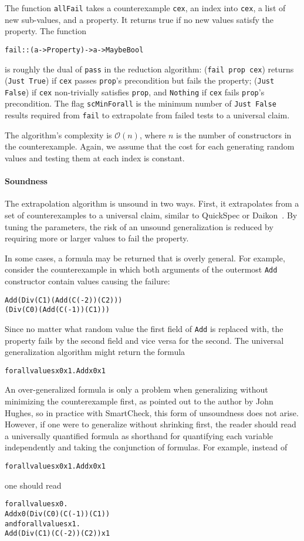\documentclass{sigplanconf}
\newenvironment{code}{\begin{alltt}\footnotesize}{\end{alltt}}
\newcommand{\ttp}[1]{\texttt{#1}}
\begin{document}
The function \ttp{allFail} takes a counterexample \ttp{cex}, an index into
\ttp{cex}, a list of new sub-values, and a property.  It returns true if no new
values satisfy the property.  The function
%
\begin{code}
fail :: (a -> Property) -> a -> Maybe Bool
\end{code}
%
\noindent
is roughly the dual of \ttp{pass} in the reduction algorithm: (\ttp{fail
  prop cex}) returns (\ttp{Just True}) if \ttp{cex} passes \ttp{prop}'s
precondition but fails the property; (\ttp{Just False}) if \ttp{cex}
non-trivially satisfies \ttp{prop}, and \ttp{Nothing} if \ttp{cex} fails
\ttp{prop}'s precondition.  The flag \ttp{scMinForall} is the minimum number
of \ttp{Just False} results required from \ttp{fail} to extrapolate from failed
tests to a universal claim.

The algorithm's complexity is $\mathcal{O}(n)$, where $n$ is the number of
constructors in the counterexample.  Again, we assume that the cost for each
generating random values and testing them at each index is constant.

\paragraph{Soundness}
The extrapolation algorithm is unsound in two ways.  First, it extrapolates from
a set of counterexamples to a universal claim, similar to QuickSpec or
Daikon~\cite{qs,daikon}.  By tuning the parameters, the risk of an unsound
generalization is reduced by requiring more or larger values to fail the
property.

In some cases, a formula may be returned that is overly general.  For example,
consider the counterexample in which both arguments of the outermost \ttp{Add}
constructor contain values causing the failure:
%
\begin{code}
Add (Div (C 1) (Add (C (-2)) (C 2)))
    (Div (C 0) (Add (C (-1)) (C 1)))
\end{code}
%
\noindent
Since no matter what random value the first field of \ttp{Add} is replaced with,
the property fails by the second field and vice versa for the second.  The
universal generalization algorithm might return the formula
\noindent
%
\begin{code}
forall values x0 x1 . Add x0 x1
\end{code}
%
\noindent
An over-generalized formula is only a problem when generalizing without
minimizing the counterexample first, as pointed out to the author by John
Hughes, so in practice with SmartCheck, this form of unsoundness does not arise.
However, if one were to generalize without shrinking first, the reader should
read a universally quantified formula as shorthand for quantifying each variable
independently and taking the conjunction of formulas.  For example, instead of
%
\begin{code}
forall values x0 x1 . Add x0 x1
\end{code}
%
\noindent
one should read
%
%
\begin{code}
      forall values x0 .
        Add x0 (Div (C 0) (C (-1)) (C 1))
  and forall values x1 .
        Add (Div (C 1) (C (-2)) (C 2)) x1
\end{code}
\end{document}
